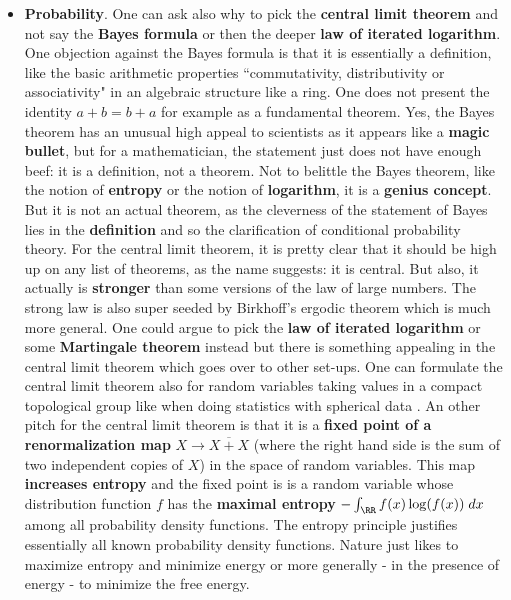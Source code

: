 \documentclass[12pt]{amsart}
\newcounter{example}    \def\example#1{ \item \fontsize{12}{15} \selectfont #1 \fontsize{12}{15} \selectfont }
\begin{document}
\begin{itemize}
\item {\bf Probability}. One can ask also why to pick the {\bf central limit theorem} and not say the 
{\bf Bayes formula} or then the deeper {\bf law of iterated logarithm}.
One objection against the Bayes formula is that it is essentially a definition, 
like the basic arithmetic properties ``commutativity, distributivity or associativity" in 
an algebraic structure like a ring. One does not present the identity $a+b=b+a$ for example as a fundamental theorem.
Yes, the Bayes theorem has an unusual high appeal to scientists as it appears like a {\bf magic
bullet}, but for a mathematician, the statement just does not have enough
beef: it is a definition, not a theorem. Not to belittle the Bayes theorem, like the notion
of {\bf entropy} or the notion of {\bf logarithm}, it is a {\bf genius concept}. But it is not an 
actual theorem, as the cleverness of the statement of Bayes lies in the {\bf definition} and so the
clarification of conditional probability theory.
For the central limit theorem, it is pretty clear that it should be high up on any list of theorems,
as the name suggests: it is central. But also, it actually is {\bf stronger} than some versions of the law of large 
numbers. The strong law is also super seeded by Birkhoff's ergodic theorem which is much more general. 
One could argue to pick the {\bf law of iterated logarithm} or some {\bf Martingale theorem} instead
but there is something appealing in the central limit theorem which goes over to other set-ups. One
can formulate the central limit theorem also for random variables taking values in a compact topological
group like when doing statistics with spherical data \cite{FLE}. An other pitch for the central 
limit theorem is that it is a {\bf fixed point of a renormalization map} $X \to \overline{X + X}$ (where the 
right hand side is the sum of two independent copies of $X$) in the space of random variables. 
This map {\bf increases entropy} and the fixed point is is a random variable whose distribution function 
$f$ has the {\bf maximal entropy} $- \int_{\RR} f(x) \log(f(x)) \; dx$ among all probability density functions. 
The entropy principle justifies essentially all known probability density functions. Nature just likes to 
maximize entropy and minimize energy or more generally - in the presence of energy - to minimize the free energy.


\end{itemize}
\end{document}
